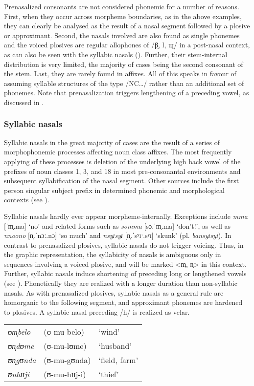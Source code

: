 Prenasalized consonants are not considered phonemic for a number of reasons. First, when they occur across morpheme boundaries, as in the above examples, they can clearly be analysed as the result of a nasal segment followed by a plosive or approximant. Second, the nasals involved are also found as single phonemes and the voiced plosives are regular allophones of /β̞, l, ɰ/ in a post-nasal context, as can also be seen with the syllabic nasals (). Further, their stem-internal distribution is very limited, the majority of cases being the second consonant of the stem. Last, they are rarely found in affixes. All of this speaks in favour of assuming syllable structures of the type /NC\ldots / rather than an additional set of phonemes. Note that prenasalization triggers lengthening of a preceding vowel, as discussed in .

\subsubsection{Syllabic nasals}\label{SyllabicNasals}
Syllabic nasals in the great majority of cases are the result of a series of morphophonemic processes affecting noun class affixes. The most frequently applying of these processes is deletion of the underlying high back vowel of the prefixes of noun classes 1, 3, and 18 in most pre-consonantal environments and subsequent syllabification of the nasal segment. Other sources include the first person singular subject prefix in determined phonemic and morphological contexts (see ).

Syllabic nasals hardly ever appear morpheme-internally. Exceptions include \textit{mma} [ˈm̩.ma] `no' and related forms such as \textit{somma} [sɔ.ˈm̩.ma] `don't!', as well as \textit{nnoono} [n̩.ˈnɔː.nɔ] `so much' and \textit{nsyɪsyɪ} [n̩.ˈsʸɪˑ.sʸɪ] `skunk' (pl. \textit{bansyɪsyɪ}). In contrast to prenasalized plosives, syllabic nasals do not trigger voicing. Thus, in the graphic representation, the syllabicity of nasals is ambiguous only in sequences involving a voiced plosive, and will be marked <m̩, n̩> in this context. Further, syllabic nasals induce shortening of preceding long or lengthened vowels (see ). Phonetically they are realized with a longer duration than non-syllabic nasals. As with prenasalized plosives, syllabic nasals as a general rule are homorganic to the following segment, and approximant phonemes are hardened to plosives. A syllabic nasal preceding /h/ is realized as velar. 
\begin{exe}
	\ex\begin{tabular}[t]{lll}
		\textit{ʊm̩belo}&(\degree ʊ-mu-belo)&`wind'\\
		\textit{ʊn̩dʊme}&(\degree ʊ-mu-lʊme)&`husband'\\
		\textit{ʊn̩gʊnda}&(\degree ʊ-mu-gʊnda)&`field, farm'\\
		\textit{ʊnhɪɪji}&(\degree ʊ-mu-hɪɪj-i)&`thief'
	\end{tabular}
\end{exe}
